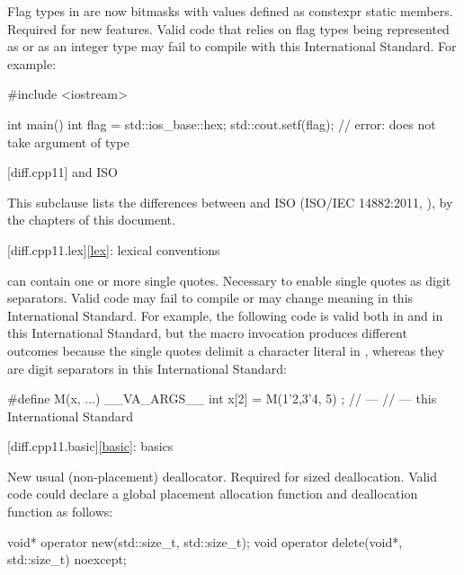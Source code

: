 \change
Flag types in  are now bitmasks with values
defined as constexpr static members.
\rationale
Required for new features.
\effect
Valid \CppIII{} code that relies on  flag types being
represented as  or as an integer type may fail to compile
with this International Standard. For example:

\begin{codeblock}
#include <iostream>

int main() {
  int flag = std::ios_base::hex;
  std::cout.setf(flag);         // error:  does not take argument of type 
}
\end{codeblock}

[diff.cpp11]{\Cpp{} and ISO \CppXI{}}

\pnum
{}%
This subclause lists the differences between \Cpp{} and
ISO \CppXI{} (ISO/IEC 14882:2011, ),
by the chapters of this document.

[diff.cpp11.lex]{\ref{lex}: lexical conventions}

\change
{} can contain one or more single quotes.
\rationale
Necessary to enable single quotes as digit separators.
\effect
Valid \CppXI{} code may fail to compile or may change meaning in this
International Standard. For example, the following code is valid both in \CppXI{} and in
this International Standard, but the macro invocation produces different outcomes
because the single quotes delimit a character literal in \CppXI{}, whereas they are digit
separators in this International Standard:

\begin{codeblock}
#define M(x, ...) __VA_ARGS__
int x[2] = { M(1'2,3'4, 5) };
//  --- \CppXI{}
//  --- this International Standard
\end{codeblock}

[diff.cpp11.basic]{\ref{basic}: basics}

\change
New usual (non-placement) deallocator.
\rationale
Required for sized deallocation.
\effect
Valid \CppXI{} code could declare a global placement allocation function and
deallocation function as follows:

\begin{codeblock}
void* operator new(std::size_t, std::size_t);
void operator delete(void*, std::size_t) noexcept;
\end{codeblock}

